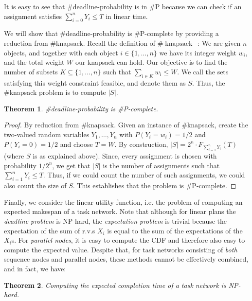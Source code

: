 \documentclass{article}
\newtheorem{theorem}{Theorem}
\begin{document}
It is easy to see that \#deadline-probability is in \#P because we can check if an assignment satisfies $\sum_{i=0}^{n} Y_{i} \leq T$ in linear time.

We will show that \#deadline-probability is \#P-complete by providing a reduction from \#knapsack. Recall the definition of $\#\operatorname{knapsack}$~\cite{arora2009computational}: We are given $n$ objects, and together with each object $i\in \{1,\dots , n\}$ we have its integer weight $w_i$, and the total weight $W$ our knapsack can hold. Our objective is to find the number of subsets $K \subseteq \{1, \dots , n\}$ such that $\sum_{i \in K} w_i \leq W$. We call the sets satisfying this weight constraint feasible, and denote them as $S$. Thus, the \#knapsack problem is to compute $|S|$.

\begin{theorem} \label{deadlinSP}
\#deadline-probability is \#P-complete.
\end{theorem}

\begin{proof} By reduction from \#knapsack. Given an instance of \#knapsack, create the two-valued random variables $Y_{1},\dots,Y_{n} $ with $P(Y_i=w_i)=1/2$ and $P(Y_i=0)=1/2$ and choose $T=W$. By construction, $|S|=2^n \cdot F_{\sum_{i=1}^{n} Y_{i}}(T)$ (where $S$ is as explained above). Since, every assignment is chosen with probability $1/2^n$, we get that $|S|$ is the number of assignments such that $\sum_{i=1}^{n} Y_{i} \leq T$. Thus, if we could count the number of such assignments, we could also count the size of $S$. This establishes that the problem is \#P-complete. 
\end{proof}

Finally, we consider the linear utility function, i.e. the problem
of computing an expected makespan of a task network.
Note that although for linear plans the {\em deadline problem} is NP-hard, the {\em expectation problem} is trivial because the expectation
of the sum of r.v.s $X_i$ is equal to the sum of the expectations of the $X_i$s.
For {\em parallel nodes}, it is easy to compute the CDF and therefore also easy to
compute the expected value.
Despite that, for task networks consisting of {\em  both} sequence nodes and
parallel nodes, these methods cannot be effectively combined, and in fact, we have:
\begin{theorem}
Computing the expected completion time of a task network is NP-hard.
\end{theorem}
\end{document}
